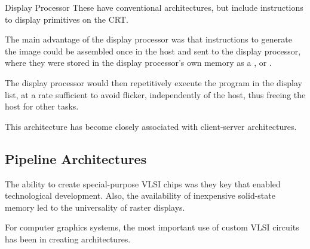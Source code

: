 \documentclass[../COS3712_Notes.tex]{subfiles}
\begin{document}
        \begin{definition}{Display Processor}
          These have conventional architectures,
          but include instructions to display primitives on the CRT.

          The main advantage of the display processor
          was that instructions to generate the image
          could be assembled once in the host and sent to the display processor,
          where they were stored in the display processor's own memory
          as a , or .

          The display processor would then
          repetitively execute the program in the display list,
          at a rate sufficient to avoid flicker,
          independently of the host,
          thus freeing the host for other tasks.
        \end{definition}

        This architecture has become closely associated with
        client-server architectures.

      \subsection{Pipeline Architectures}
        The ability to create special-purpose VLSI chips
        was they key that enabled technological development.
        Also, the availability of inexpensive solid-state memory
        led to the universality of raster displays.

        For computer graphics systems,
        the most important use of custom VLSI circuits has been in creating
         architectures.
\end{document}

